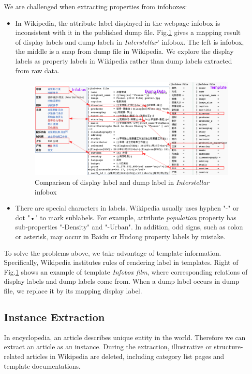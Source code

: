 \documentclass[runningheads,a4paper]{llncs}
\begin{document}
\begin{CJK*}{UTF8}{song}
We are challenged when extracting properties from infoboxes:
\begin{itemize}
    \item In Wikipedia, the attribute label displayed in the webpage infobox is inconsistent with it in the published dump file. Fig.\ref{fig:infobox-template} gives a mapping result of display labels and dump labels in \emph{Interstellar}' infobox. The left is infobox, the middle is a snap from dump file in Wikipedia. We explore the display labels as property labels in Wikipedia rather than dump labels extracted from raw data.
    \begin{figure}[ht]
        \centerline{\includegraphics[width=1\columnwidth]{fig/infobox-template}}
        \caption{Comparison of display label and dump label in \emph{Interstellar} infobox}
        \label{fig:infobox-template}
    \end{figure}%
\item There are special characters in labels. Wikipedia usually uses hyphen "-" or dot "•" to mark sublabels. For example, attribute \emph{population} property has sub-properties "-Density" and "-Urban". In addition, odd signs, such as colon or asterisk, may occur in Baidu or Hudong property labels by mistake.
\end{itemize}

To solve the problems above, we take advantage of template information. Specifically, Wikipedia institutes rules of rendering label in templates. Right of Fig.\ref{fig:infobox-template} shows an example of template \emph{Infobox film}, where corresponding relations of display labels and dump labels come from. When a dump label occurs in dump file, we replace it by its mapping display label.

\subsection{Instance Extraction}
\label{sec:ie}
In encyclopedia, an article describes unique entity in the world. Therefore we can extract an article as an instance. During the extraction, illustrative or structure-related articles in Wikipedia are deleted, including category list pages and template documentations.


\end{CJK*}
\end{document}

